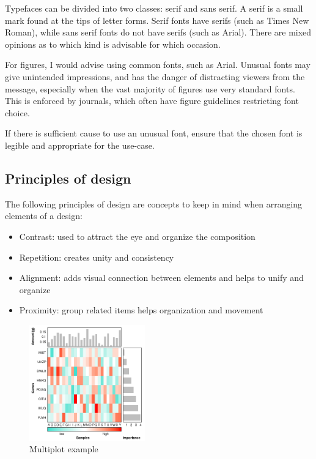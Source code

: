 \documentclass[letterpaper]{report}\usepackage[]{graphicx}\usepackage[]{color}
\begin{document}
Typefaces can be divided into two classes: serif and \textsf{sans serif}. A serif is a small mark found at the tips of letter forms. Serif fonts have serifs (such as Times New Roman), while \textsf{sans serif} fonts do not have serifs (such as Arial). There are mixed opinions as to which kind is advisable for which occasion.

For figures, I would advise using common fonts, such as Arial. Unusual fonts may give unintended impressions, and has the danger of distracting viewers from the message, especially when the vast majority of figures use very standard fonts. This is enforced by journals, which often have figure guidelines restricting font choice. 

If there is sufficient cause to use an unusual font, ensure that the chosen font is legible and appropriate for the use-case. 

\subsection{Principles of design}
The following principles of design are concepts to keep in mind when arranging elements of a design: \cite{williams}
\begin{itemize}
\item Contrast: used to attract the eye and organize the composition
\item Repetition: creates unity and consistency
\item Alignment: adds visual connection between elements and helps to unify and organize
\item Proximity: group related items helps organization and movement
\end{itemize}

\begin{figure}[!ht]
  \begin{center}
     \includegraphics[width=50mm]{Figures/Multiplot_Ex2.png}
     \caption{Multiplot example}
  \end{center}
\end{figure}
\end{document}
